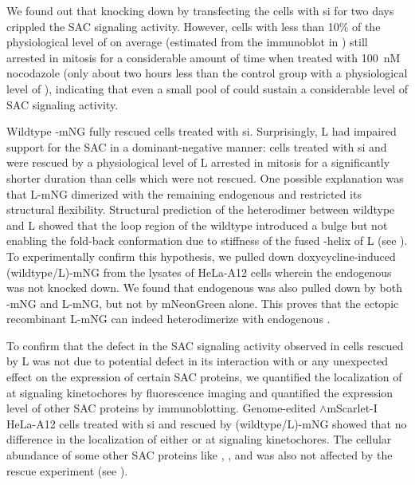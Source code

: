 We found out that knocking down  by transfecting the cells with si for two days crippled the SAC signaling activity. However, cells with less than 10\% of the physiological level of  on average (estimated from the immunoblot in ) still arrested in mitosis for a considerable amount of time when treated with \SI{100}{nM} nocodazole (only about two hours less than the control group with a physiological level of ), indicating that even a small pool of  could sustain a considerable level of SAC signaling activity.


Wildtype -mNG fully rescued cells treated with si. Surprisingly, \textDelta{}L had impaired support for the SAC in a dominant-negative manner: cells treated with si and were rescued by a physiological level of \textDelta{}L arrested in mitosis for a significantly shorter duration than cells which were not rescued. One possible explanation was that \textDelta{}L-mNG dimerized with the remaining endogenous  and restricted its structural flexibility. Structural prediction of the heterodimer between wildtype  and \textDelta{}L showed that the loop region of the wildtype  introduced a bulge but not enabling the fold-back conformation due to stiffness of the fused \textalpha{}-helix of \textDelta{}L (see ). To experimentally confirm this hypothesis, we pulled down doxycycline-induced (wildtype/\textDelta{}L)-mNG from the lysates of HeLa-A12 cells wherein the endogenous  was not knocked down. We found that endogenous  was also pulled down by both -mNG and \textDelta{}L-mNG, but not by mNeonGreen alone. This proves that the ectopic recombinant \textDelta{}L-mNG can indeed heterodimerize with endogenous .

To confirm that the defect in the SAC signaling activity observed in cells rescued by \textDelta{}L was not due to potential defect in its interaction with  or any unexpected effect on the expression of certain SAC proteins, we quantified the localization of  at signaling kinetochores by fluorescence imaging and quantified the expression level of other SAC proteins by immunoblotting. Genome-edited $\wedge$mScarlet-I HeLa-A12 cells treated with si and rescued by (wildtype/\textDelta{}L)-mNG showed that no difference in the localization of either  or  at signaling kinetochores. The cellular abundance of some other SAC proteins like , , and  was also not affected by the rescue experiment (see ).

